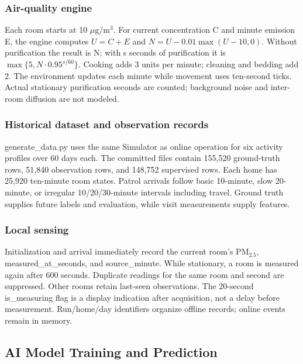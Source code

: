\documentclass[conference]{IEEEtran}
\newcommand{\pmfine}{\ensuremath{\mathrm{PM}_{2.5}}}
\newcommand{\pmunit}{\ensuremath{\mu\mathrm{g}/\mathrm{m}^3}}
\begin{document}
\subsubsection{Air-quality engine}

Each room starts at 10 \pmunit{}. For current concentration C and minute emission E, the engine computes $U=C+E$ and $N=U-0.01\max(U-10,0)$. Without purification the result is N; with s seconds of purification it is $\max\{5,N\cdot 0.95^{s/60}\}$. Cooking adds 3 units per minute; cleaning and bedding add 2. The environment updates each minute while movement uses ten-second ticks. Actual stationary purification seconds are counted; background noise and inter-room diffusion are not modeled.

\subsubsection{Historical dataset and observation records}

generate\_\allowbreak{}data.py uses the same Simulator as online operation for six activity profiles over 60 days each. The committed files contain 155,520 ground-truth rows, 51,840 observation rows, and 148,752 supervised rows. Each home has 25,920 ten-minute room states. Patrol arrivals follow basic 10-minute, slow 20-minute, or irregular 10/20/30-minute intervals including travel. Ground truth supplies future labels and evaluation, while visit measurements supply features.

\subsubsection{Local sensing}

Initialization and arrival immediately record the current room's \pmfine{}, measured\_\allowbreak{}at\_\allowbreak{}seconds, and source\_\allowbreak{}minute. While stationary, a room is measured again after 600 seconds. Duplicate readings for the same room and second are suppressed. Other rooms retain last-seen observations. The 20-second is\_\allowbreak{}measuring flag is a display indication after acquisition, not a delay before measurement. Run/home/day identifiers organize offline records; online events remain in memory.

\subsection{AI Model Training and Prediction}
\end{document}
